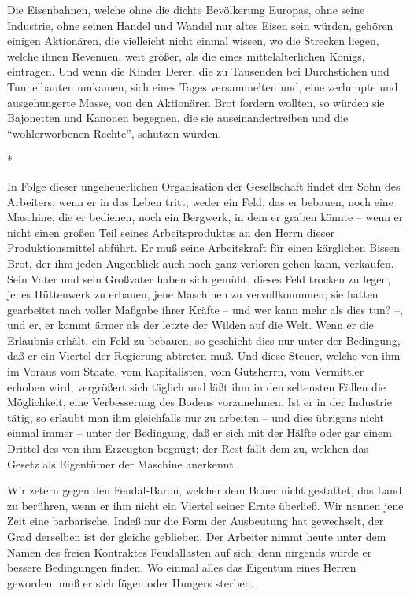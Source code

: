 \documentclass{scrbook}
\begin{document}
Die Eisenbahnen, welche ohne die dichte Bevölkerung Europas, ohne seine Industrie, ohne seinen Handel und Wandel nur altes Eisen sein würden, gehören einigen Aktionären, die vielleicht nicht einmal wissen, wo die Strecken liegen, welche ihnen Revenuen, weit größer, als die eines mittelalterlichen Königs, eintragen. Und wenn die Kinder Derer, die zu Tausenden bei Durchstichen und Tunnelbauten umkamen, sich eines Tages versammelten und, eine zerlumpte und ausgehungerte Masse, von den Aktionären Brot fordern wollten, so würden sie Bajonetten und Kanonen begegnen, die sie auseinandertreiben und die ``wohlerworbenen Rechte'', schützen würden.

\begin{center}*\end{center}

In Folge dieser ungeheuerlichen Organisation der Gesellschaft findet der Sohn des Arbeiters, wenn er in das Leben tritt, weder ein Feld, das er bebauen, noch eine Maschine, die er bedienen, noch ein Bergwerk, in dem er graben könnte – wenn er nicht einen großen Teil seines Arbeitsproduktes an den Herrn dieser Produktionsmittel abführt. Er muß seine Arbeitskraft für einen kärglichen Bissen Brot, der ihm jeden Augenblick auch noch ganz verloren gehen kann, verkaufen. Sein Vater und sein Großvater haben sich gemüht, dieses Feld trocken zu legen, jenes Hüttenwerk zu erbauen, jene Maschinen zu vervollkommnen; sie hatten gearbeitet nach voller Maßgabe ihrer Kräfte – und wer kann mehr als dies tun? –, und er, er kommt ärmer als der letzte der Wilden auf die Welt. Wenn er die Erlaubnis erhält, ein Feld zu bebauen, so geschieht dies nur unter der Bedingung, daß er ein Viertel der Regierung abtreten muß. Und diese Steuer, welche von ihm im Voraus vom Staate, vom Kapitalisten, vom Gutsherrn, vom Vermittler erhoben wird, vergrößert sich täglich und läßt ihm in den seltensten Fällen die Möglichkeit, eine Verbesserung des Bodens vorzunehmen. Ist er in der Industrie tätig, so erlaubt man ihm gleichfalls nur zu arbeiten – und dies übrigens nicht einmal immer – unter der Bedingung, daß er sich mit der Hälfte oder gar einem Drittel des von ihm Erzeugten begnügt; der Rest fällt dem zu, welchen das Gesetz als Eigentümer der Maschine anerkennt.

Wir zetern gegen den Feudal-Baron, welcher dem Bauer nicht gestattet, das Land zu berühren, wenn er ihm nicht ein Viertel seiner Ernte überließ. Wir nennen jene Zeit eine barbarische. Indeß nur die Form der Ausbeutung hat gewechselt, der Grad derselben ist der gleiche geblieben. Der Arbeiter nimmt heute unter dem Namen des freien Kontraktes Feudallasten auf sich; denn nirgends würde er bessere Bedingungen finden. Wo einmal alles das Eigentum eines Herren geworden, muß er sich fügen oder Hungers sterben.
\end{document}
